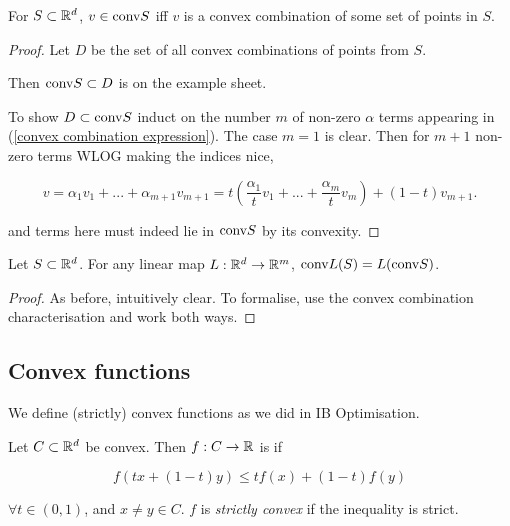 \documentclass[11pt]{scrartcl}
\begin{document}
\begin{lemma}
For $S \subset \mathbb R^d$, $v \in \text{conv} S$ iff $v$ is a convex combination of some set of points in $S$.

\begin{proof}
Let $D$ be the set of all convex combinations of points from $S$.

Then $\text{conv} S \subset D$ is on the example sheet.

To show $D \subset \text{conv} S$ induct on the number $m$ of non-zero $\alpha$ terms appearing in  (\ref{convex combination expression}). The case $m=1$ is clear. Then for $m+1$ non-zero terms WLOG making the indices nice,

\begin{equation}
     v = \alpha_1 v_1 + ... + \alpha_{m+1} v_{m+1} = t \left(\frac{\alpha_1}{t} v_1 + ... + \frac{\alpha_m}{t} v_m\right) + (1-t) v_{m+1}.
\end{equation}

and terms here must indeed lie in $\text{conv} S$ by its convexity.
\end{proof}
\end{lemma}

\begin{theorem}
\label{linear convex lem}
Let $S \subset \mathbb R^d$. For any linear map $L : \mathbb R^d \rightarrow \mathbb R^m$, $\text{conv} L(S) = L(\text{conv} S)$.

\begin{proof}
As before, intuitively clear. To formalise, use the convex combination characterisation and work both ways.
\end{proof}
\end{theorem}

\subsection{Convex functions}

We define (strictly) convex functions as we did in IB Optimisation.

\begin{definition}
Let $C \subset \mathbb R^d$ be convex. Then $f : C \rightarrow \mathbb R$ is  if %

\begin{equation}
    f(tx + (1-t)y) \le tf(x) + (1-t)f(y)
\end{equation}

$\forall t \in (0,1)$, and $x \neq y \in C$. $f$ is \emph{strictly convex} if the inequality is strict.
\end{definition}
\end{document}
